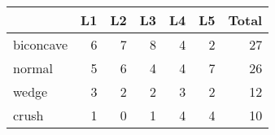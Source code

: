 \begin{tabular}{lrrrrrr}
\toprule
{} &  L1 &  L2 &  L3 &  L4 &  L5 &  Total \\
\midrule
biconcave &   6 &   7 &   8 &   4 &   2 &     27 \\
normal    &   5 &   6 &   4 &   4 &   7 &     26 \\
wedge     &   3 &   2 &   2 &   3 &   2 &     12 \\
crush     &   1 &   0 &   1 &   4 &   4 &     10 \\
\bottomrule
\end{tabular}
